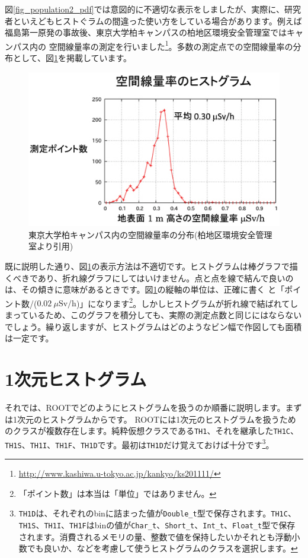 図\ref{fig_population2_pdf}では意図的に不適切な表示をしましたが、実際に、研究者といえどもヒストぐラムの間違った使い方をしている場合があります。例えば福島第一原発の事故後、東京大学柏キャンパスの柏地区環境安全管理室ではキャンパス内の 空間線量率の測定を行いました\footnote{\url{http://www.kashiwa.u-tokyo.ac.jp/kankyo/ks201111/}}。多数の測定点での空間線量率の分布として、図\ref{fig_Kashiwa_png}を掲載しています。

\begin{figure}
  \centering
  \includegraphics[scale=0.8]{fig/Kashiwa.png}
  \caption{東京大学柏キャンパス内の空間線量率の分布(柏地区環境安全管理室より引用)}
  \label{fig_Kashiwa_png}
\end{figure}

既に説明した通り、図\ref{fig_Kashiwa_png}の表示方法は不適切です。ヒストグラムは棒グラフで描くべきであり、折れ線グラフにしてはいけません。点と点を線で結んで良いのは、その傾きに意味があるときです。図\ref{fig_Kashiwa_png}の縦軸の単位は、正確に書く と「ポイント数/($0.02\ \mu\mathrm{Sv/h}$)」になります\footnote{「ポイント数」は本当は「単位」ではありません。}。しかしヒストグラムが折れ線で結ばれてしまっているため、このグラフを積分しても、実際の測定点数と同じにはならないでしょう。繰り返しますが、ヒストグラムはどのようなビン幅で作図しても面積は一定です。

\section{1次元ヒストグラム}

それでは、ROOTでどのようにヒストグラムを扱うのか順番に説明します。まずは1次元のヒストグラムからです。 ROOTには1次元のヒストグラムを扱うためのクラスが複数存在します。純粋仮想クラスである\texttt{TH1}、それを継承した\texttt{TH1C}、\texttt{TH1S}、\texttt{TH1I}、\texttt{TH1F}、\texttt{TH1D}です。最初は\texttt{TH1D}だけ覚えておけば十分です\footnote{\texttt{TH1D}は、それぞれのbinに詰まった値が\texttt{Double\_t}型で保存されます。\texttt{TH1C}、\texttt{TH1S}、\texttt{TH1I}、\texttt{TH1F}はbinの値が\texttt{Char\_t}、\texttt{Short\_t}、\texttt{Int\_t}、\texttt{Float\_t}型で保存されます。消費されるメモリの量、整数で値を保持したいかそれとも浮動小数でも良いか、などを考慮して使うヒストグラムのクラスを選択します。}。

